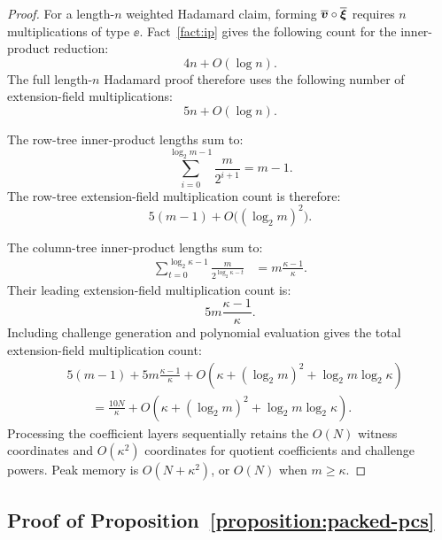 \begin{proof}
For a length-\(n\) weighted Hadamard claim, forming
\(
    \overline{\bm v}\circ\overline{\bm\xi}
\)
requires \(n\) multiplications of type \(\ee\). Fact~\ref{fact:ip}
gives the following count for the inner-product reduction:
\[
    4n+O(\log n).
\]
The full length-\(n\) Hadamard proof therefore uses the following
number of extension-field multiplications:
\[
    5n+O(\log n).
\]

The row-tree inner-product lengths sum to:
\[
    \sum_{i=0}^{\log_2m-1}
    \frac{m}{2^{i+1}}
    =
    m-1.
\]
The row-tree extension-field multiplication count is therefore:
\[
    5(m-1)
    +
    O\bigl((\log_2m)^2\bigr).
\]

The column-tree inner-product lengths sum to:
\[
\begin{aligned}
    \sum_{t=0}^{\log_2\kappa-1}
    \frac{m}{2^{\log_2\kappa-t}}
    &=
    m\frac{\kappa-1}{\kappa}.
\end{aligned}
\]
Their leading extension-field multiplication count is:
\[
    5m\frac{\kappa-1}{\kappa}.
\]
Including challenge generation and polynomial evaluation gives
the total extension-field multiplication count:
\[
\begin{aligned}
    &5(m-1)
    +
    5m\frac{\kappa-1}{\kappa}
    +
    O\left(
        \kappa
        +
        (\log_2m)^2
        +
        \log_2m\log_2\kappa
    \right)\\
    &\qquad=
    \frac{10N}{\kappa}
    +
    O\left(
        \kappa
        +
        (\log_2m)^2
        +
        \log_2m\log_2\kappa
    \right).
\end{aligned}
\]
Processing the coefficient layers sequentially retains the
\(O(N)\) witness coordinates and \(O(\kappa^2)\) coordinates
for quotient coefficients and challenge powers. Peak memory is
\(O(N+\kappa^2)\), or \(O(N)\) when \(m\geq\kappa\).
\end{proof}

\subsection{Proof of Proposition~\ref{proposition:packed-pcs}}
\label{appx:proof-pcs}

